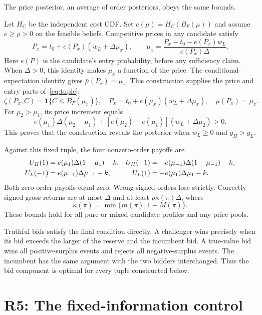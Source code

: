 \documentclass[12pt]{article}
\newcommand{\ind}{\mathbf 1}
\newcommand{\D}{\Delta}
\begin{document}
The price posterior, an average of order posteriors, obeys the same bounds.

Let $H_C$ be the independent cost CDF.
Set $e(\mu)=H_C(B_F(\mu))$ and assume $e\ge\rho>0$ on the feasible beliefs.
Competitive prices in any candidate satisfy
\begin{equation}\label{eq:inverse}
 P_x=t_0+e(P_x)(w_L+\D\mu_x),\qquad
 \mu_x=\frac{P_x-t_0-e(P_x)w_L}{e(P_x)\D}.
\end{equation}
Here $e(P)$ is the candidate's entry probability, before any sufficiency claim.
When $\D>0$, this identity makes $\mu_x$ a function of the price.
The conditional-expectation identity gives $\bar\mu(P_x)=\mu_x$.
This construction supplies the price and entry parts of~\eqref{eq:tuple}:
\begin{equation}\label{eq:construction}
 \zeta(P_x,C)=\ind\{C\le B_F(\mu_x)\},\quad
 P_x=t_0+e(\mu_x)(w_L+\D\mu_x),\quad \bar\mu(P_x)=\mu_x.
\end{equation}
For $\mu_2>\mu_1$, its price increment equals
\[
 e(\mu_1)\D(\mu_2-\mu_1)
 +[e(\mu_2)-e(\mu_1)](w_L+\D\mu_2)>0.
\]
This proves that the construction reveals the posterior when $w_L\ge0$ and $g_H>g_L$.

Against this fixed tuple, the four nonzero-order payoffs are
\begin{align}\label{eq:payoffs}
 U_H(1)&=e(\mu_1)\D(1-\mu_1)-k,&
 U_H(-1)&=-e(\mu_{-1})\D(1-\mu_{-1})-k,\\
 U_L(-1)&=e(\mu_{-1})\D\mu_{-1}-k,&
 U_L(1)&=-e(\mu_1)\D\mu_1-k.\notag
\end{align}
Both zero-order payoffs equal zero.
Wrong-signed orders lose strictly.
Correctly signed gross returns are at most $\D$ and at least $\rho\kappa(\pi)\D$, where
\[
 \kappa(\pi)=\min\{m(\pi),1-M(\pi)\}.
\]
These bounds hold for all pure or mixed candidate profiles and any price pools.

Truthful bids satisfy the final condition directly.
A challenger wins precisely when its bid exceeds the larger of the reserve and the incumbent bid.
A true-value bid wins all positive-surplus events and rejects all negative-surplus events.
The incumbent has the same argument with the two bidders interchanged.
Thus the bid component is optimal for every tuple constructed below.

\section{R5: The fixed-information control}
\end{document}
